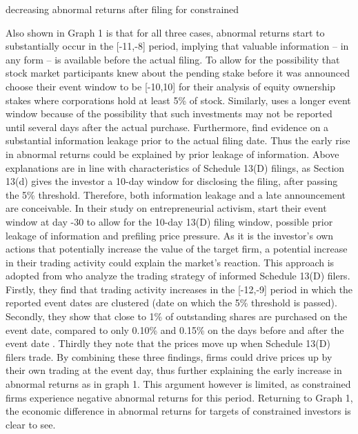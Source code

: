 \documentclass[12pt]{article}
\begin{document}
decreasing abnormal returns after filing for constrained

Also shown in Graph 1 is that for all three cases, abnormal returns start to substantially occur in the [-11,-8] period, implying that valuable information -- in any form -- is available before the actual filing. To allow for the possibility that stock market participants knew about the pending stake before it was announced \citet[p.2802]{Allen2000} choose their event window to be [-10,10] for their analysis of equity ownership stakes where corporations hold at least 5\% of stock. Similarly, \citep[p.87]{Liao2014} uses a longer event window because of the possibility that such investments may not be reported until several days after the actual purchase. Furthermore, \citet[p.31]{Brigida2012} find evidence on a substantial information leakage prior to the actual filing date. Thus the early rise in abnormal returns could be explained by prior leakage of information. Above explanations are in line with characteristics of Schedule 13(D) filings, as Section 13(d) gives the investor a 10-day window for disclosing the filing, after passing the 5\% threshold. Therefore, both information leakage and a late announcement are conceivable. In their study on entrepreneurial activism, \citet[p.207]{Klein2009} start their event window at day -30 to allow for the 10-day 13(D) filing window, possible prior leakage of information and prefiling price pressure. As it is the investor's own actions that potentially increase the value of the target firm, a potential increase in their trading activity could explain the market's reaction. This approach is adopted from  \citet[p.1561]{Collin-Dufresne2015} who analyze the trading strategy of informed Schedule 13(D) filers. Firstly, they find that trading activity increases in the [-12,-9] period in which the reported event dates are clustered (date on which the 5\% threshold is passed). Secondly, they show that close to 1\% of outstanding shares are purchased on the event date, compared to only 0.10\% and 0.15\% on the days before and after the event date \citep[p.1561]{Collin-Dufresne2015}. Thirdly they note that the prices move up when Schedule 13(D) filers trade. By combining these three findings, firms could drive prices up by their own trading at the event day, thus further explaining the early increase in abnormal returns as in graph 1. This argument however is limited, as constrained firms experience negative abnormal returns for this period. Returning to Graph 1, the economic difference in abnormal returns for targets of constrained investors is clear to see.\\ 
\end{document}
